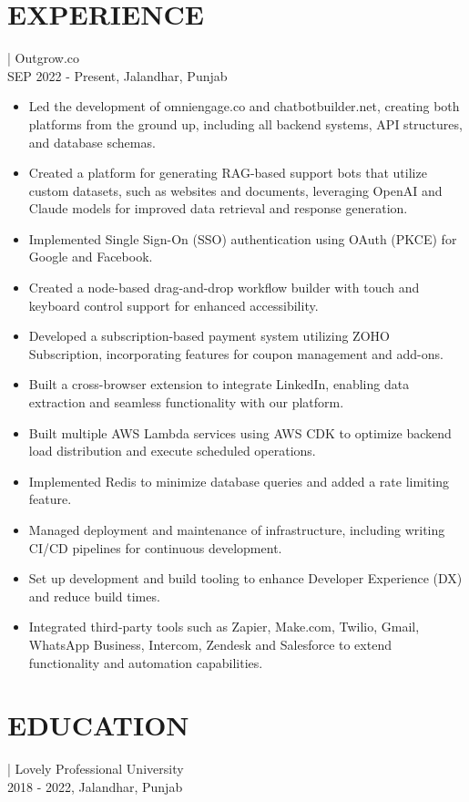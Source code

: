\documentclass[]{resume}
\begin{document}
\section{EXPERIENCE}
 | \textrm{Outgrow.co}\\
SEP 2022 - Present, Jalandhar, Punjab
\begin{itemize}
  \item Led the development of omniengage.co and chatbotbuilder.net, creating both platforms from the ground up, including all backend systems, API structures, and database schemas.
  \item Created a platform for generating RAG-based support bots that utilize custom datasets, such as websites and documents, leveraging OpenAI and Claude models for improved data retrieval and response generation.
  \item Implemented Single Sign-On (SSO) authentication using OAuth (PKCE) for Google and Facebook.
  \item Created a node-based drag-and-drop workflow builder with touch and keyboard control support for enhanced accessibility.
  \item Developed a subscription-based payment system utilizing ZOHO Subscription, incorporating features for coupon management and add-ons.
  \item Built a cross-browser extension to integrate LinkedIn, enabling data extraction and seamless functionality with our platform.
  \item Built multiple AWS Lambda services using AWS CDK to optimize backend load distribution and execute scheduled operations.
  \item Implemented Redis to minimize database queries and added a rate limiting feature.
  \item Managed deployment and maintenance of infrastructure, including writing CI/CD pipelines for continuous development.
  \item Set up development and build tooling to enhance Developer Experience (DX) and reduce build times.
  \item Integrated third-party tools such as Zapier, Make.com, Twilio, Gmail, WhatsApp Business, Intercom, Zendesk and Salesforce to extend functionality and automation capabilities.
\end{itemize}

\section{EDUCATION}
 | \textrm{Lovely Professional University}\\
2018 - 2022, Jalandhar, Punjab
\end{document}
